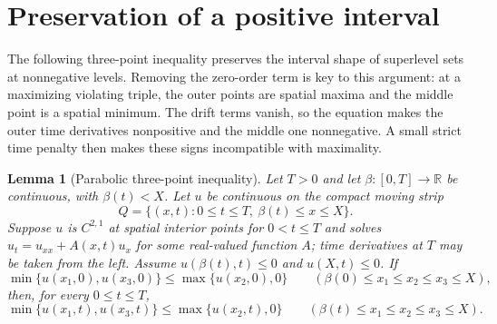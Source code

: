 \documentclass[11pt]{article}
\newtheorem{lemma}[theorem]{Lemma}
\newcommand{\R}{\mathbb{R}}
\begin{document}
\section{Preservation of a positive interval}

The following three-point inequality preserves the interval shape of
superlevel sets at nonnegative levels.
Removing the zero-order term is key to this argument: at a maximizing
violating triple, the outer points are spatial maxima and the middle
point is a spatial minimum. The drift terms vanish, so the equation
makes the outer time derivatives nonpositive and the middle one
nonnegative. A small strict time penalty then makes these signs
incompatible with maximality.

\begin{lemma}[Parabolic three-point inequality]\label{lem:threepoint}
Let $T>0$ and let $\beta:[0,T]\to\R$ be continuous, with $\beta(t)<X$. Let
$u$ be continuous on the compact moving strip
\[
  Q=\{(x,t):0\le t\le T,\ \beta(t)\le x\le X\}.
\]
Suppose $u$ is $C^{2,1}$ at spatial interior points for $0<t\le T$
and solves $u_t=u_{xx}+A(x,t)u_x$ for some real-valued function $A$;
time derivatives at $T$ may be taken from the left. Assume
$u(\beta(t),t)\le0$ and $u(X,t)\le0$. If
\[
  \min\{u(x_1,0),u(x_3,0)\}\le\max\{u(x_2,0),0\}
  \qquad(\beta(0)\le x_1\le x_2\le x_3\le X),
\]
then, for every $0\le t\le T$,
\begin{equation}\label{eq:threepoint}
  \min\{u(x_1,t),u(x_3,t)\}\le\max\{u(x_2,t),0\}
  \qquad(\beta(t)\le x_1\le x_2\le x_3\le X).
\end{equation}
\end{lemma}
\end{document}
